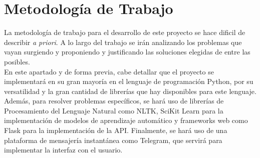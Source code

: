 \section{Metodología de Trabajo}\label{sec:metodología}

La metodología de trabajo para el desarrollo de este proyecto se hace dificil de describir \textit{a priori}. A lo largo del trabajo se irán analizando los problemas que vayan surgiendo y proponiendo y justificando las soluciones elegidas de entre las posibles.\\

En este apartado y de forma previa, cabe detallar que el proyecto se implementará en su gran mayoría en el lenguaje de programación Python, por su versatilidad y la gran cantidad de librerías que hay disponibles para este lenguaje. Además, para resolver problemas específicos, se hará uso de librerías de Procesamiento del Lenguaje Natural como NLTK, SciKit Learn para la implementación de modelos de aprendizaje automático y frameworks web como Flask para la implementación de la API. Finalmente, se hará uso de una plataforma de mensajería instantánea como Telegram, que servirá para implementar la interfaz con el usuario.